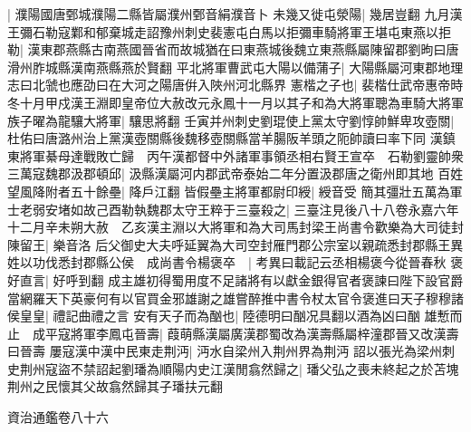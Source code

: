 |{
	濮陽國唐鄄城濮陽二縣皆屬濮州鄄音絹濮音卜}
未幾又徙屯滎陽|{
	幾居豈翻}
九月漢王彌石勒寇鄴和郁棄城走詔豫州刺史裴憲屯白馬以拒彌車騎將軍王堪屯東燕以拒勒|{
	漢東郡燕縣古南燕國晉省而故城猶在曰東燕城後魏立東燕縣屬陳留郡劉昫曰唐滑州胙城縣漢南燕縣燕於賢翻}
平北將軍曹武屯大陽以備蒲子|{
	大陽縣屬河東郡地理志曰北虢也應劭曰在大河之陽唐倂入陜州河北縣界}
憲楷之子也|{
	裴楷仕武帝惠帝時}
冬十月甲戍漢王淵即皇帝位大赦改元永鳳十一月以其子和為大將軍聰為車騎大將軍族子曜為龍驤大將軍|{
	驤思將翻}
壬寅并州刺史劉琨使上黨太守劉惇帥鮮卑攻壺關|{
	杜佑曰唐潞州治上黨漢壺關縣後魏移壺關縣當羊腸阪羊頭之阨帥讀曰率下同}
漢鎮東將軍綦母達戰敗亡歸　丙午漢都督中外諸軍事領丞相右賢王宣卒　石勒劉靈帥衆三萬寇魏郡汲郡頓邱|{
	汲縣漢屬河内郡武帝泰始二年分置汲郡唐之衛州即其地}
百姓望風降附者五十餘壘|{
	降戶江翻}
皆假壘主將軍都尉印綬|{
	綬音受}
簡其彊壯五萬為軍士老弱安堵如故己酉勒執魏郡太守王粹于三臺殺之|{
	三臺注見後八十八卷永嘉六年}
十二月辛未朔大赦　乙亥漢主淵以大將軍和為大司馬封梁王尚書令歡樂為大司徒封陳留王|{
	樂音洛}
后父御史大夫呼延翼為大司空封雁門郡公宗室以親疏悉封郡縣王異姓以功伐悉封郡縣公侯　成尚書令楊褒卒　|{
	考異曰載記云丞相楊褒今從晉春秋}
褒好直言|{
	好呼到翻}
成主雄初得蜀用度不足諸將有以獻金銀得官者褒諫曰陛下設官爵當網羅天下英豪何有以官買金邪雄謝之雄嘗醉推中書令杖太官令褒進曰天子穆穆諸侯皇皇|{
	禮記曲禮之言}
安有天子而為酗也|{
	陸德明曰酗况具翻以酒為凶曰酗}
雄慙而止　成平寇將軍李鳳屯晉壽|{
	葭萌縣漢屬廣漢郡蜀改為漢壽縣屬梓潼郡晉又改漢壽曰晉壽}
屢寇漢中漢中民東走荆沔|{
	沔水自梁州入荆州界為荆沔}
詔以張光為梁州刺史荆州寇盜不禁詔起劉璠為順陽内史江漢閒翕然歸之|{
	璠父弘之喪未終起之於苫塊荆州之民懷其父故翕然歸其子璠扶元翻}


資治通鑑卷八十六
